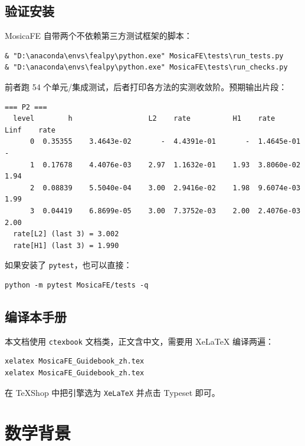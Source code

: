 \documentclass[UTF8,11pt,oneside]{ctexbook}
\theoremstyle{definition}
\theoremstyle{plain}
\newcommand{\mosica}{\textsf{MosicaFE}}
\newcommand{\code}[1]{\texttt{#1}}
\begin{document}
\section{验证安装}

\mosica{} 自带两个不依赖第三方测试框架的脚本：

\begin{lstlisting}[style=shell]
& "D:\anaconda\envs\fealpy\python.exe" MosicaFE\tests\run_tests.py
& "D:\anaconda\envs\fealpy\python.exe" MosicaFE\tests\run_checks.py
\end{lstlisting}

前者跑 54 个单元/集成测试，后者打印各方法的实测收敛阶。预期输出片段：

\begin{lstlisting}[style=textout]
=== P2 ===
  level        h                  L2    rate          H1    rate        Linf    rate
      0  0.35355    3.4643e-02       -  4.4391e-01       -  1.4645e-01       -
      1  0.17678    4.4076e-03    2.97  1.1632e-01    1.93  3.8060e-02    1.94
      2  0.08839    5.5040e-04    3.00  2.9416e-02    1.98  9.6074e-03    1.99
      3  0.04419    6.8699e-05    3.00  7.3752e-03    2.00  2.4076e-03    2.00
  rate[L2] (last 3) = 3.002
  rate[H1] (last 3) = 1.990
\end{lstlisting}

如果安装了 \code{pytest}，也可以直接：

\begin{lstlisting}[style=shell]
python -m pytest MosicaFE/tests -q
\end{lstlisting}

\section{编译本手册}

本文档使用 \code{ctexbook} 文档类，正文含中文，需要用 XeLaTeX{} 编译两遍：

\begin{lstlisting}[style=shell]
xelatex MosicaFE_Guidebook_zh.tex
xelatex MosicaFE_Guidebook_zh.tex
\end{lstlisting}

在 TeXShop 中把引擎选为 \code{XeLaTeX} 并点击 Typeset 即可。

\chapter{数学背景}
\label{chap:math}
\end{document}
